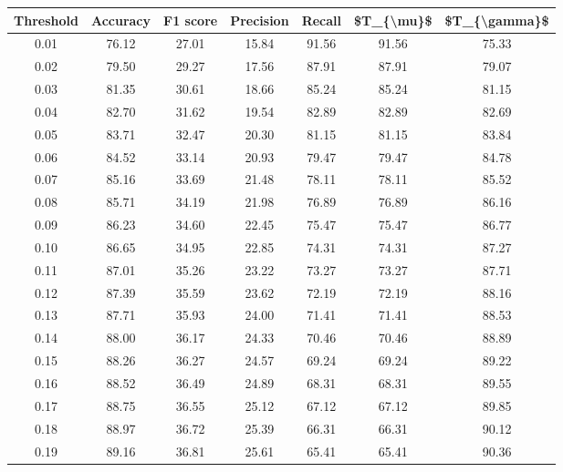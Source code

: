 \begin{tabular}{|c|c|c|c|c|c|c|}
\hline
 Threshold &  Accuracy &  F1 score &  Precision &  Recall &  \$T\_\{\textbackslash mu\}\$ &  \$T\_\{\textbackslash gamma\}\$ \\
\hline
      0.01 &     76.12 &     27.01 &      15.84 &   91.56 &      91.56 &         75.33 \\
      0.02 &     79.50 &     29.27 &      17.56 &   87.91 &      87.91 &         79.07 \\
      0.03 &     81.35 &     30.61 &      18.66 &   85.24 &      85.24 &         81.15 \\
      0.04 &     82.70 &     31.62 &      19.54 &   82.89 &      82.89 &         82.69 \\
      0.05 &     83.71 &     32.47 &      20.30 &   81.15 &      81.15 &         83.84 \\
      0.06 &     84.52 &     33.14 &      20.93 &   79.47 &      79.47 &         84.78 \\
      0.07 &     85.16 &     33.69 &      21.48 &   78.11 &      78.11 &         85.52 \\
      0.08 &     85.71 &     34.19 &      21.98 &   76.89 &      76.89 &         86.16 \\
      0.09 &     86.23 &     34.60 &      22.45 &   75.47 &      75.47 &         86.77 \\
      0.10 &     86.65 &     34.95 &      22.85 &   74.31 &      74.31 &         87.27 \\
      0.11 &     87.01 &     35.26 &      23.22 &   73.27 &      73.27 &         87.71 \\
      0.12 &     87.39 &     35.59 &      23.62 &   72.19 &      72.19 &         88.16 \\
      0.13 &     87.71 &     35.93 &      24.00 &   71.41 &      71.41 &         88.53 \\
      0.14 &     88.00 &     36.17 &      24.33 &   70.46 &      70.46 &         88.89 \\
      0.15 &     88.26 &     36.27 &      24.57 &   69.24 &      69.24 &         89.22 \\
      0.16 &     88.52 &     36.49 &      24.89 &   68.31 &      68.31 &         89.55 \\
      0.17 &     88.75 &     36.55 &      25.12 &   67.12 &      67.12 &         89.85 \\
      0.18 &     88.97 &     36.72 &      25.39 &   66.31 &      66.31 &         90.12 \\
      0.19 &     89.16 &     36.81 &      25.61 &   65.41 &      65.41 &         90.36 \\

\end{tabular}
